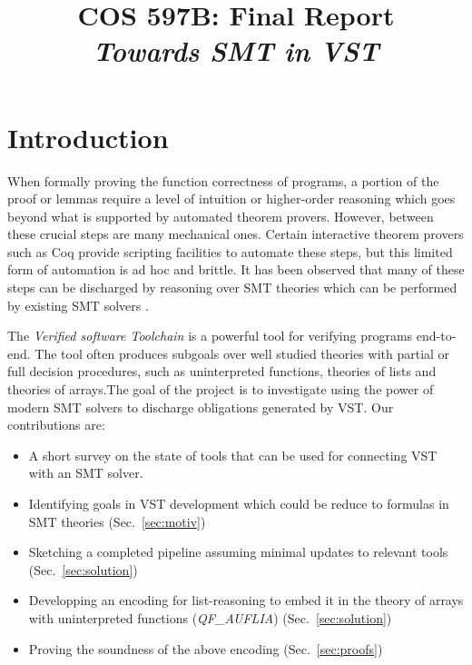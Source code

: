 \documentclass[onecolumn, preprint]{sigplanconf}
\title{COS 597B: Final Report\\
\emph{Towards SMT in VST}}
\begin{document}
\maketitle


\section{Introduction}
When formally proving the function correctness of programs, a portion of the proof or lemmas require a level of intuition or higher-order reasoning which goes beyond what is supported by automated theorem provers. However, between these crucial steps are many mechanical ones. Certain interactive theorem provers such as Coq provide scripting facilities to automate these steps, but this limited form of automation is ad hoc and brittle. It has been observed that many of these steps can be discharged by reasoning over SMT theories which can be performed by existing SMT solvers \citep{appelnote}. 

The \emph{Verified software Toolchain} is a powerful tool for verifying programs end-to-end. %
The tool often produces subgoals over well studied theories with partial or full decision procedures, such as uninterpreted functions, theories of lists and theories of arrays.The goal of the project is to investigate using the power of modern SMT solvers to discharge obligations generated by VST. Our contributions are:
\begin{itemize}
\item A short survey on the state of tools that can be used for connecting VST with an SMT solver. %
 \item Identifying goals in VST development which could be reduce to formulas in SMT theories (Sec.~\ref{sec:motiv})
 \item Sketching a completed pipeline assuming minimal updates to relevant tools (Sec.~\ref{sec:solution})
 \item Developping an encoding for list-reasoning to embed it in the theory of arrays with uninterpreted functions (\emph{QF\_AUFLIA}) (Sec.~\ref{sec:solution})
 \item Proving the soundness of the above encoding (Sec.~\ref{sec:proofs})
\end{itemize}
\end{document}
